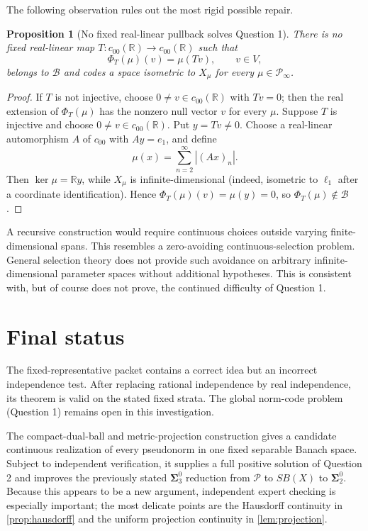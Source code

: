 \documentclass[11pt]{article}
\newtheorem{proposition}[theorem]{Proposition}
\theoremstyle{definition}
\newcommand{\Pcal}{\mathcal P}
\newcommand{\Bcal}{\mathcal B}
\newcommand{\R}{\mathbb R}
\begin{document}
The following observation rules out the most rigid possible repair.

\begin{proposition}[No fixed real-linear pullback solves Question 1]
\label{prop:no-fixed}
There is no fixed real-linear map $T:c_{00}(\R)\to c_{00}(\R)$ such that
\[
 \Phi_T(\mu)(v)=\mu(Tv),\qquad v\in V,
\]
belongs to $\Bcal$ and codes a space isometric to $X_\mu$ for every
$\mu\in\Pcal_\infty$.
\end{proposition}

\begin{proof}
If $T$ is not injective, choose $0\neq v\in c_{00}(\R)$ with $Tv=0$; then the
real extension of $\Phi_T(\mu)$ has the nonzero null vector $v$ for every $\mu$.
Suppose $T$ is injective and choose $0\neq v\in c_{00}(\R)$.  Put $y=Tv\neq0$.
Choose a real-linear automorphism $A$ of $c_{00}$ with $Ay=e_1$, and define
\[
 \mu(x)=\sum_{n=2}^{\infty}|(Ax)_n|.
\]
Then $\ker\mu=\R y$, while $X_\mu$ is infinite-dimensional (indeed, isometric
to $\ell_1$ after a coordinate identification).  Hence
$\Phi_T(\mu)(v)=\mu(y)=0$, so $\Phi_T(\mu)\notin\Bcal$.
\end{proof}

A recursive construction would require continuous choices outside varying
finite-dimensional spans.  This resembles a zero-avoiding continuous-selection
problem.  General selection theory does not provide such avoidance on arbitrary
infinite-dimensional parameter spaces without additional hypotheses.  This is
consistent with, but of course does not prove, the continued difficulty of
Question 1.

\section{Final status}

The fixed-representative packet contains a correct idea but an incorrect
independence test.  After replacing rational independence by real independence,
its theorem is valid on the stated fixed strata.  The global norm-code problem
(Question 1) remains open in this investigation.

The compact-dual-ball and metric-projection construction gives a candidate
continuous realization of every pseudonorm in one fixed separable Banach space.
Subject to independent verification, it supplies a full positive solution of
Question 2 and improves
the previously stated $\boldsymbol\Sigma^0_3$ reduction from $\Pcal$ to
$SB(X)$ to $\boldsymbol\Sigma^0_2$.  Because this appears to be a new argument,
independent expert checking is especially important; the most delicate points
are the Hausdorff continuity in \cref{prop:hausdorff} and the uniform projection
continuity in \cref{lem:projection}.
\end{document}
